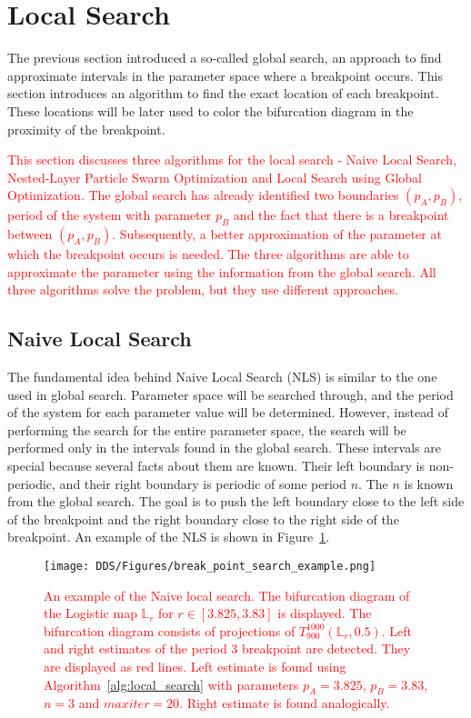 \section{Local Search}
The previous section introduced a so-called global search, an approach to find approximate intervals in the parameter space where a breakpoint occurs.
This section introduces an algorithm to find the exact location of each breakpoint.
These locations will be later used to color the bifurcation diagram in the proximity of the breakpoint.
\par
\textcolor{red}{
This section discusses three algorithms for the local search - Naive Local Search, Nested-Layer Particle Swarm Optimization and Local Search using Global Optimization.
The global search has already identified two boundaries $(p_A, p_B)$, period of the system with parameter $p_B$ and the fact that there is a breakpoint between $(p_A, p_B)$.
Subsequently, a better approximation of the parameter at which the breakpoint occurs is needed.
The three algorithms are able to approximate the parameter using the information from the global search.
All three algorithms solve the problem, but they use different approaches.
}

\subsection{Naive Local Search}
The fundamental idea behind Naive Local Search (NLS) is similar to the one used in global search.
Parameter space will be searched through, and the period of the system for each parameter value will be determined.
However, instead of performing the search for the entire parameter space, the search will be performed only in the intervals found in the global search.
These intervals are special because several facts about them are known.
Their left boundary is non-periodic, and their right boundary is periodic of some period $n$.
The $n$ is known from the global search.
The goal is to push the left boundary close to the left side of the breakpoint and the right boundary close to the right side of the breakpoint.
An example of the NLS is shown in Figure~\ref{fig:break_point_search_example}.

\begin{figure}[!h]
    \centering
    \texttt{[image: DDS/Figures/break\_point\_search\_example.png]}
    \caption{
        \textcolor{red}{
        An example of the Naive local search.
        The bifurcation diagram of the Logistic map $\mathbb{L}_{r}$ for $r \in [ 3.825, 3.83 ]$ is displayed.
        The bifurcation diagram consists of projections of $T_{900}^{1000}(\mathbb{L}_{r}, 0.5)$.
        Left and right estimates of the period $3$ breakpoint are detected.
        They are displayed as red lines.
        Left estimate is found using Algorithm~\ref{alg:local_search} with parameters $p_A = 3.825$, $p_B = 3.83$, $n = 3$ and $maxiter = 20$.
        Right estimate is found analogically.
        }
    }
    \label{fig:break_point_search_example}
\end{figure}



